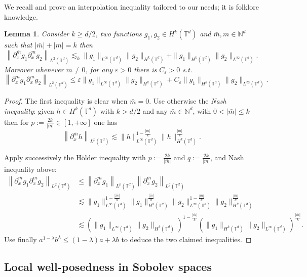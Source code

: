 \documentclass[10pt]{amsart}
\newtheorem{lemm}[theo]{Lemma}\newtheorem{prop}[theo]{Proposition}\newtheorem{coro}[theo]{Corollary}\newtheorem{conj}[theo]{Conjecture}
\theoremstyle{definition}\newtheorem{defi}[theo]{Definition}\newtheorem{rema}[theo]{Remark}\newtheorem{exam}[theo]{Example}\newtheorem{exem}[theo]{Example}\newtheorem{nota}[theo]{Notation}
\newcommand{\N}{\mathbb{N}}
\newcommand{\T}{\mathbb{T}}
\newcommand*\eps{\varepsilon}
\begin{document}
We recall and prove an interpolation inequality tailored to our needs; it is folklore knowledge.

\begin{lemm}\label{lem:product}
Consider $k \ge d/2$, two functions $g_1, g_2 \in H^k(\T^d)$ and ${\bar m}, m \in \N^d$ such that $|{\bar m}| + |m| = k$ then
\[
\left\| \partial^{\bar m}_x g_1 \partial_x ^m g_2 \right\|_{L^2(\T^d)}
\lesssim_k \| g_1 \|_{L^\infty(\T^d)} \| g_2 \|_{H^k(\T^d)} +
\| g_1 \|_{H^k(\T^d)} \| g_2 \|_{L^\infty(\T^d)}.
\]
Moreover whenever ${\bar m} \not =0$, for any $\eps>0$ there is $C_\eps>0$ s.t.
\begin{equation}\label{eq:producteps}
\left\| \partial^{\bar m}_x g_1 \partial_x ^m g_2 \right\|_{L^2(\T^d)}
\le \eps \| g_1 \|_{L^\infty(\T^d)} \| g_2 \|_{H^k(\T^d)} + C_\eps \| g_1 \|_{H^k(\T^d)} \| g_2 \|_{L^\infty(\T^d)}.
\end{equation}
\end{lemm}


\begin{proof}
The first inequality is clear when $\bar m=0$. Use otherwise the \emph{Nash inequality}: given $h \in H^k(\T^d)$ with $k >d/2$ and any ${\bar m} \in \N^d$, with $0 < |{\bar m}| \le k$ then for $p := \frac{2k}{|{\bar m}|} \in [1,+\infty]$ one has
\[
\left\| \partial^{\bar m}_x h \right\|_{L^p(\T^d)} \lesssim \| h
\|_{L^\infty(\T^d)} ^{1-\frac{|{\bar m}|}k} \| h \|_{H^k(\T^d)} ^{\frac{|{\bar m}|}k}.
\]

Apply successively the H\"older inequality with $p := \frac{2k}{|{\bar m}|}$ and $q := \frac{2k}{|m|}$, and Nash inequality above:
\begin{align*}
\left\| \partial^{\bar m}_x g_1 \partial_x ^m g_2 \right\|_{L^2(\T^d)} & \le \left\| \partial^{\bar m}_x g_1 \right\|_{L^p(\T^d)} \left\|
\partial^{\bar m}_x g_2 \right\|_{L^q(\T^d)} \\
& \lesssim \| g_1\|_{L^\infty(\T^d)} ^{1-\frac{|{\bar m}|}{k}}
\| g_1 \|_{H^k(\T^d)}^{\frac{|{\bar m}|}k} \| g_2
\|_{L^\infty(\T^d)} ^{1-\frac{|m|}k} \| g_2 \|_{H^k(\T^d)} ^{\frac{|m|}k} \\
& \lesssim \left(\| g_1\|_{L^\infty(\T^d)} \| g_2
\|_{H^k(\T^d)}\right)^{1-\frac{|{\bar m}|}k}
\left(\| g_1 \|_{H^k(\T^d)} \| g_2\|_{L^\infty(\T^d)}
\right)^{\frac{|{\bar m}|}k}.
\end{align*}
Use finally $a^{1-\lambda} b^\lambda \le (1-\lambda)a + \lambda b$ to deduce the two claimed inequalities.
\end{proof}

\subsection{Local well-posedness in Sobolev spaces}\label{sec:local-wellp-sobol}
\end{document}
